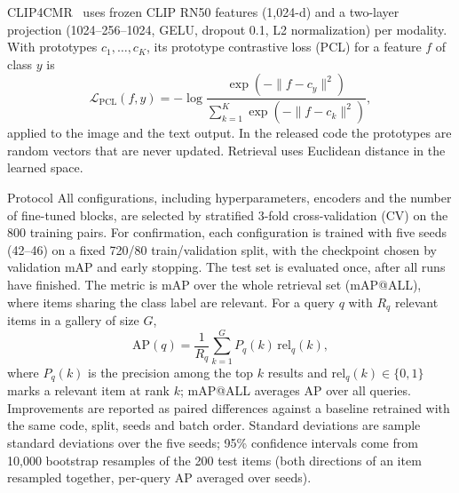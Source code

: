 \documentclass[conference]{IEEEtran}
\makeatletter
\def\subsection{\@startsection{subsection}{2}{\z@}{1.6ex plus .8ex minus .4ex}{.7ex plus .2ex}%
  {\normalfont\fontsize{11}{13}\selectfont\bfseries\itshape\raggedright}}
\makeatother
\begin{document}
CLIP4CMR~\cite{clip4cmr} uses frozen CLIP RN50 features (1,024-d) and a two-layer projection (1024--256--1024, GELU, dropout 0.1, L2 normalization) per modality. With prototypes $c_1, \dots, c_K$, its prototype contrastive loss (PCL) for a feature $f$ of class $y$ is
\begin{equation}
\mathcal{L}_{\mathrm{PCL}}(f, y) = -\log \frac{\exp(-\lVert f - c_y\rVert^2)}{\sum_{k=1}^{K} \exp(-\lVert f - c_k\rVert^2)},
\end{equation}
applied to the image and the text output. In the released code the prototypes are random vectors that are never updated. Retrieval uses Euclidean distance in the learned space.

\subsection{Protocol}
\label{sec:protocol}
All configurations, including hyperparameters, encoders and the number of fine-tuned blocks, are selected by stratified 3-fold cross-validation (CV) on the 800 training pairs. For confirmation, each configuration is trained with five seeds (42--46) on a fixed 720/80 train/validation split, with the checkpoint chosen by validation mAP and early stopping. The test set is evaluated once, after all runs have finished. The metric is mAP over the whole retrieval set (mAP@ALL), where items sharing the class label are relevant. For a query $q$ with $R_q$ relevant items in a gallery of size $G$,
\begin{equation}
\mathrm{AP}(q) = \frac{1}{R_q} \sum_{k=1}^{G} P_q(k)\,\mathrm{rel}_q(k),
\end{equation}
where $P_q(k)$ is the precision among the top $k$ results and $\mathrm{rel}_q(k) \in \{0, 1\}$ marks a relevant item at rank $k$; mAP@ALL averages AP over all queries. Improvements are reported as paired differences against a baseline retrained with the same code, split, seeds and batch order. Standard deviations are sample standard deviations over the five seeds; 95\% confidence intervals come from 10,000 bootstrap resamples of the 200 test items (both directions of an item resampled together, per-query AP averaged over seeds).
\end{document}
